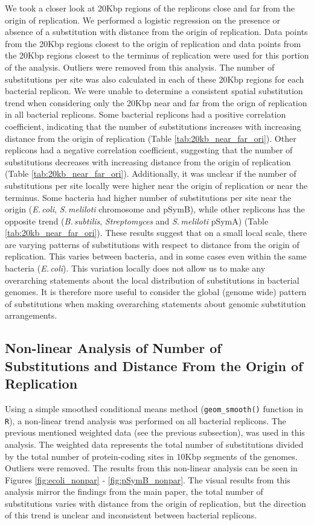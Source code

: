 \documentclass[11pt]{article}
\newcommand{\smel}{\textit{S.\,meliloti}\xspace}
\newcommand{\strep}{\textit{Streptomyces}\xspace}
\newcommand{\ecol}{\textit{E.\,coli}\xspace}
\newcommand{\bass}{\textit{B.\,subtilis}\xspace}
\newcommand{\pa}{pSymA\xspace}
\newcommand{\pb}{pSymB\xspace}
\begin{document}
We took a closer look at 20Kbp regions of the replicons close and far from the origin of replication.
We performed a logistic regression on the presence or absence of a substitution with distance from the origin of replication.
Data points from the 20Kbp regions closest to the origin of replication and data points from the 20Kbp regions closest to the terminus of replication were used for this portion of the analysis.
Outliers were removed from this analysis.
The number of substitutions per site was also calculated in each of these 20Kbp regions for each bacterial replicon.
We were unable to determine a consistent spatial substitution trend when considering only the 20Kbp near and far from the orign of replication in all bacterial replicons.
Some bacterial replicons had a positive correlation coefficient, indicating that the number of substitutions increases with increasing distance from the origin of replication (Table \ref{tab:20kb_near_far_ori}).
Other replicons had a negative correlation coefficient, suggesting that the number of substitutions decreases with increasing distance from the origin of replication (Table \ref{tab:20kb_near_far_ori}).
Additionally, it was unclear if the number of substitutions per site locally were higher near the origin of replication or near the terminus.
Some bacteria had higher number of substitutions per site near the origin (\ecol, \smel chromosome and \pb), while other replicons has the opposite trend (\bass, \strep and \smel \pa) (Table \ref{tab:20kb_near_far_ori}).
These results suggest that on a small local scale, there are varying patterns of substitutions with respect to distance from the origin of replication.
This varies between bacteria, and in some cases even within the same bacteria (\ecol).
This variation locally does not allow us to make any overarching statements about the local distribution of substitutions in bacterial genomes.
It is therefore more useful to consider the global (genome wide) pattern of substitutions when making overarching statements about genomic substitution arrangements.


\subsection{Non-linear Analysis of Number of Substitutions and Distance From the Origin of Replication}

Using a simple smoothed conditional means method (\texttt{geom\_smooth()} function in \texttt{R}), a non-linear trend analysis was performed on all bacterial replicons.
The previous mentioned weighted data (see the previous subsection), was used in this analysis.
The weighted data represents the total number of substitutions divided by the total number of protein-coding sites in 10Kbp segments of the genomes.
Outliers were removed.
The results from this non-linear analysis can be seen in Figures \ref{fig:ecoli_nonpar} - \ref{fig:pSymB_nonpar}.
The visual results from this analysis mirror the findings from the main paper, the total number of substitutions varies with distance from the origin of replication, but the direction of this trend is unclear and inconsistent between bacterial replicons.
 
\end{document}
